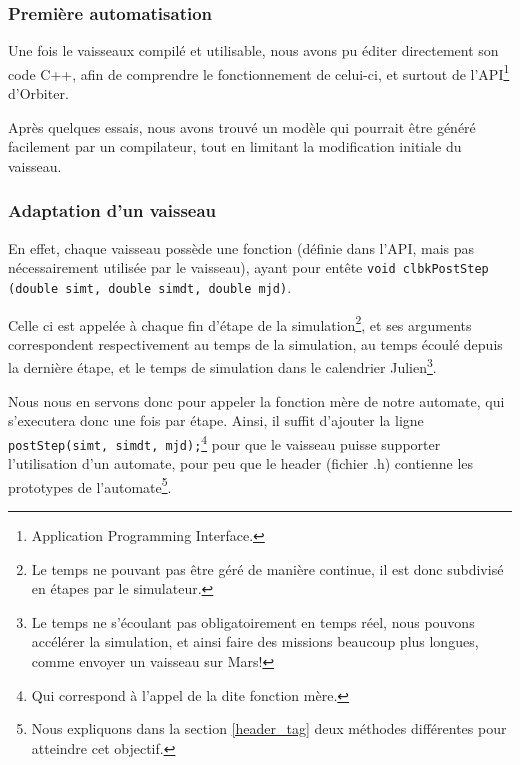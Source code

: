 \documentclass[a4paper,11pt]{article}
\begin{document}

    \subsubsection{Première automatisation}
        Une fois le vaisseaux compilé et utilisable, nous avons pu éditer directement son code C++, afin de comprendre le fonctionnement de celui-ci, et surtout de l'API\footnote{Application Programming Interface.} d'Orbiter.

        Après quelques essais, nous avons trouvé un modèle qui pourrait être généré facilement par un compilateur, tout en limitant la modification initiale du vaisseau.
        
        
    \subsubsection{Adaptation d'un vaisseau}
        En effet, chaque vaisseau possède une fonction (définie dans l'API, mais pas nécessairement utilisée par le vaisseau), ayant pour entête \texttt{void clbkPostStep (double simt, double simdt, double mjd)}. 
        
        Celle ci est appelée à chaque fin d'étape de la simulation\footnote{Le temps ne pouvant pas être géré de manière continue, il est donc subdivisé en étapes par le simulateur.}, et ses arguments correspondent respectivement au temps de la simulation, au temps écoulé depuis la dernière étape, et le temps de simulation dans le calendrier Julien\footnote{Le temps ne s'écoulant pas obligatoirement en temps réel, nous pouvons accélérer la simulation, et ainsi faire des missions beaucoup plus longues, comme envoyer un vaisseau sur Mars!}.
        
        Nous nous en servons donc pour appeler la fonction \og mère\fg{} de notre automate, qui s'executera donc une fois par étape. Ainsi, il suffit d'ajouter la ligne \texttt{postStep(simt, simdt, mjd);}\footnote{Qui correspond à l'appel de la dite fonction \og mère\fg{}.} pour que le vaisseau puisse supporter l'utilisation d'un automate, pour peu que le header (fichier .h) contienne les prototypes de l'automate\footnote{Nous expliquons dans la section \ref{header_tag} deux méthodes différentes pour atteindre cet objectif.}.
\end{document}
